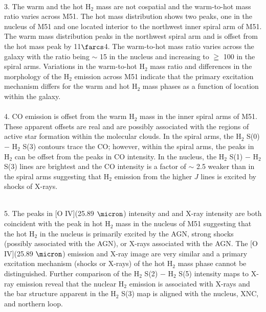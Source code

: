 \documentclass[manuscript]{aastex}
\begin{document}
\\
3.  The warm and the hot $\mathrm{H_2}$ mass are not cospatial and the warm-to-hot mass ratio varies across M51.  The hot mass distribution shows two peaks, one in the nucleus of M51 and one located interior to the northwest inner spiral arm of M51.  The warm mass distribution peaks in the northwest spiral arm and is offset from the hot mass peak by 11$\farcs$4.  The warm-to-hot mass ratio varies across the galaxy with the ratio being $\sim$ 15 in the nucleus and increasing to $\geqq$ 100 in the spiral arms.  Variations in the warm-to-hot $\mathrm{H_2}$ mass ratio and differences in the morphology of the $\mathrm{H_2}$ emission across M51 indicate that the primary excitation mechanism differs for the warm and hot $\mathrm{H_2}$ mass phases as a function of location within the galaxy.\\
\\
4. CO emission is offset from the warm $\mathrm{H_2}$ mass in the inner spiral arms of M51.  These apparent offsets are real and are possibly associated with the regions of active star formation within the molecular clouds.  In the spiral arms, the $\mathrm{H_2}$ S(0) $-$ $\mathrm{H_2}$ S(3) contours trace the CO; however, within the spiral arms, the peaks in $\mathrm{H_2}$ can be offset from the peaks in CO intensity.  In the nucleus, the $\mathrm{H_2}$ S(1) $-$ $\mathrm{H_2}$ S(3) lines are brightest and the CO intensity is a factor of $\sim$ 2.5 weaker than in the spiral arms suggesting that $\mathrm{H_2}$ emission from the higher $J$ lines is excited by shocks of X-rays.

\\
5.  The peaks in [O IV](25.89 $\micron$) intensity and and X-ray intensity are both coincident with the peak in hot $\mathrm{H_2}$ mass in the nucleus of M51 suggesting that the hot $\mathrm{H_2}$ in the nucleus is primarily excited by the AGN, strong shocks (possibly associated with the AGN), or X-rays associated with the AGN.  The [O IV](25.89 $\micron$) emission and X-ray image are very similar and a primary excitation mechanism (shocks or X-rays) of the hot $\mathrm{H_2}$ mass phase cannot be distinguished.  Further comparison of the $\mathrm{H_2}$ S(2) $-$ $\mathrm{H_2}$ S(5) intensity maps to X-ray emission reveal that the nuclear $\mathrm{H_2}$ emission is associated with X-rays and the bar structure apparent in the $\mathrm{H_2}$ S(3) map is aligned with the nucleus, XNC, and northern loop.\\
\\
\end{document}
